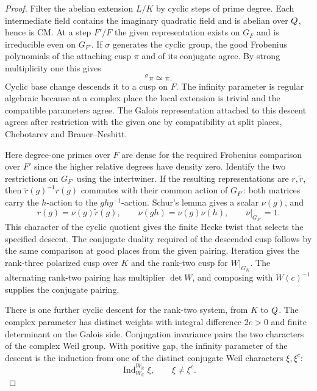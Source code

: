 \begin{proof}
Filter the abelian extension \(L/K\) by cyclic steps of
prime degree. Each intermediate field contains the
imaginary quadratic field and is abelian over \(Q\),
hence is CM. At a step \(F'/F\) the given representation
exists on \(G_F\) and is irreducible even on \(G_{F'}\).
If \(\sigma\) generates the cyclic group, the good Frobenius polynomials of the attaching cusp \(\pi\) and of its conjugate agree. By strong multiplicity one this gives
\[
 {}^\sigma\pi\simeq\pi .
\] Cyclic
base change descends it to a cusp on \(F\). The infinity
parameter is regular algebraic because at a complex place the
local extension is trivial and the compatible parameters
agree. The Galois representation attached to this
descent agrees after restriction with the given one by
compatibility at split places, Chebotarev and
Brauer--Nesbitt.

Here degree-one primes over \(F\) are
dense for the required Frobenius comparison over \(F'\) since
the higher relative degrees have density zero.
Identify the two restrictions on \(G_{F'}\) using the
intertwiner. If the resulting representations are
\(r,\widetilde r\), then \(\widetilde r(g)^{-1}r(g)\)
commutes with their common action of \(G_{F'}\): both matrices
carry the \(h\)-action to the \(ghg^{-1}\)-action.
Schur's lemma gives a scalar \(\nu(g)\), and
\[
       r(g)=\nu(g)\widetilde r(g),\qquad
       \nu(gh)=\nu(g)\nu(h),\qquad \nu|_{G_{F'}}=1 .
\]
This character of the cyclic quotient gives the finite
Hecke twist that selects the specified descent.
The conjugate duality required of the descended cusp
follows by the same comparison at good places from the
given pairing. Iteration gives the rank-three polarized cusp
over \(K\) and the rank-two cusp for \(W|_{G_K}\). The
alternating rank-two pairing has multiplier \(\det W\), and
composing with \(W(c)^{-1}\) supplies the conjugate pairing.
\hfill\mbox{\cite{arthur-clozel,clozel-rajan,harris-lan-taylor-thorne}}

There is one further cyclic descent for the rank-two
system, from \(K\) to \(Q\). The complex parameter has
distinct weights with integral difference \(2e>0\) and
finite determinant on the Galois side. Conjugation
invariance pairs the two characters of the complex Weil
group. With positive gap, the infinity parameter of the descent is the induction from one of the distinct conjugate Weil characters \(\xi,\xi^c\):
\[
 \operatorname{Ind}_{W_{\mathbb C}}^{W_{\mathbb R}}\xi,\qquad\xi\ne\xi^c .
\]


\end{proof}
